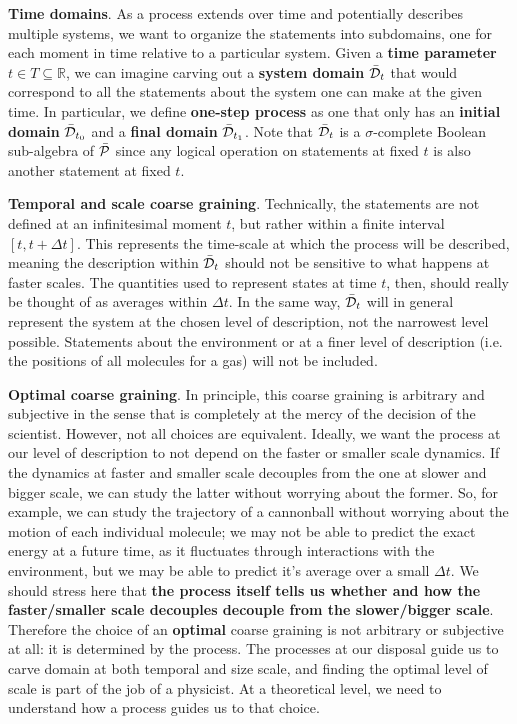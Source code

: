 \documentclass[10pt, onecolumn, longbibliography, nofootinbib]{revtex4-2}
\begin{document}
\textbf{Time domains}. As a process extends over time and potentially describes multiple systems, we want to organize the statements into subdomains, one for each moment in time relative to a particular system. Given a \textbf{time parameter} $t \in T \subseteq \mathbb{R}$, we can imagine carving out a \textbf{system domain} $\tdomain_t$ that would correspond to all the statements about the system one can make at the given time. In particular, we define \textbf{one-step process} as one that only has an \textbf{initial domain} $\tdomain_{t_0}$ and a \textbf{final domain} $\tdomain_{t_1}$. Note that $\tdomain_t$ is a $\sigma$-complete Boolean sub-algebra of $\tdomain[P]$ since any logical operation on statements at fixed $t$ is also another statement at fixed $t$.

\textbf{Temporal and scale coarse graining}. Technically, the statements are not defined at an infinitesimal moment $t$, but rather within a finite interval $[t, t + \Delta t]$. This represents the time-scale at which the process will be described, meaning the description within $\tdomain_t$ should not be sensitive to what happens at faster scales. The quantities used to represent states at time $t$, then, should really be thought of as averages within $\Delta t$. In the same way, $\tdomain_t$ will in general represent the system at the chosen level of description, not the narrowest level possible. Statements about the environment or at a finer level of description (i.e. the positions of all molecules for a gas) will not be included.

\textbf{Optimal coarse graining}. In principle, this coarse graining is arbitrary and subjective in the sense that is completely at the mercy of the decision of the scientist. However, not all choices are equivalent. Ideally, we want the process at our level of description to not depend on the faster or smaller scale dynamics. If the dynamics at faster and smaller scale decouples from the one at slower and bigger scale, we can study the latter without worrying about the former. So, for example, we can study the trajectory of a cannonball without worrying about the motion of each individual molecule; we may not be able to predict the exact energy at a future time, as it fluctuates through interactions with the environment, but we may be able to predict it's average over a small $\Delta t$. We should stress here that \textbf{the process itself tells us whether and how the faster/smaller scale decouples decouple from the slower/bigger scale}. Therefore the choice of an \textbf{optimal} coarse graining is not arbitrary or subjective at all: it is determined by the process. The processes at our disposal guide us to carve domain at both temporal and size scale, and finding the optimal level of scale is part of the job of a physicist. At a theoretical level, we need to understand how a process guides us to that choice.
\end{document}
